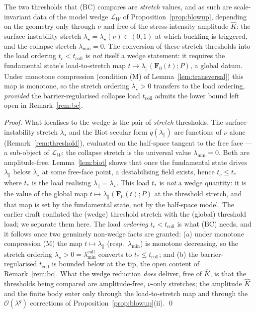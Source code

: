 \begin{lemma}
    \label{lem:bcwedge}
    The two thresholds that (BC) compares are \emph{stretch} values, and as such are scale-invariant data of the model
    wedge $\mathcal{L}_W$ of Proposition~\ref{prop:blowup}, depending on the geometry only through $\nu$ and free of the
    stress-intensity amplitude $\hat K$: the surface-instability stretch $\lambda_\star=\lambda_\star(\nu)\in(0,1)$ at
    which buckling is triggered, and the collapse stretch $\lambda_{\min}=0$. The conversion of these stretch thresholds
    into the load ordering $t_c<t_{\mathrm{coll}}$ is \emph{not} itself a wedge statement: it requires the fundamental
    state's load-to-stretch map $t\mapsto\lambda_\parallel(\bm F_0(t);P)$, a global datum. Under monotone compression
    (condition \textup{(M)} of Lemma~\ref{lem:transversal}) this map is monotone, so the stretch ordering
    $\lambda_\star>0$ transfers to the load ordering, \emph{provided} the barrier-regularised collapse load
    $t_{\mathrm{coll}}$ admits the lower bound left open in Remark~\ref{rem:bc}.
\end{lemma}

\begin{proof}
    What localises to the wedge is the pair of \emph{stretch} thresholds. The surface-instability stretch
    $\lambda_\star$ and the Biot secular form $q(\lambda_\parallel)$ are functions of $\nu$ alone
    (Remark~\ref{rem:threshold}), evaluated on the half-space tangent to the free face --- a sub-object of
    $\mathcal{L}_W$; the collapse stretch is the universal value $\lambda_{\min}=0$. Both are amplitude-free.
    Lemma~\ref{lem:biot} shows that once the fundamental state drives $\lambda_\parallel$ below $\lambda_\star$ at some
    free-face point, a destabilising field exists, hence $t_c\le t_*$ where $t_*$ is the load realising
    $\lambda_\parallel=\lambda_\star$. This load $t_*$ is \emph{not} a wedge quantity: it is the value of the global
    map $t\mapsto\lambda_\parallel(\bm F_0(t);P)$ at the threshold stretch, and that map is set by the fundamental
    state, not by the half-space model. The earlier draft conflated the (wedge) threshold stretch with the (global)
    threshold load; we separate them here. The load \emph{ordering} $t_c<t_{\mathrm{coll}}$ is what (BC) needs, and it
    follows once two genuinely non-wedge facts are granted: (a) under monotone compression (M) the map
    $t\mapsto\lambda_\parallel$ (resp.\ $\lambda_{\min}$) is monotone decreasing, so the stretch ordering
    $\lambda_\star>0=\lambda_{\min}^{\mathrm{coll}}$ converts to $t_*\le t_{\mathrm{coll}}$; and (b) the
    barrier-regularised $t_{\mathrm{coll}}$ is bounded below at the tip, the open content of Remark~\ref{rem:bc}. What
    the wedge reduction \emph{does} deliver, free of $\hat K$, is that the thresholds being compared are amplitude-free,
    $\nu$-only stretches; the amplitude $\hat K$ and the finite body enter only through the load-to-stretch map and
    through the $\mathcal{O}(\lambda^{g})$ corrections of Proposition~\ref{prop:blowup}(ii). \qed
\end{proof}

